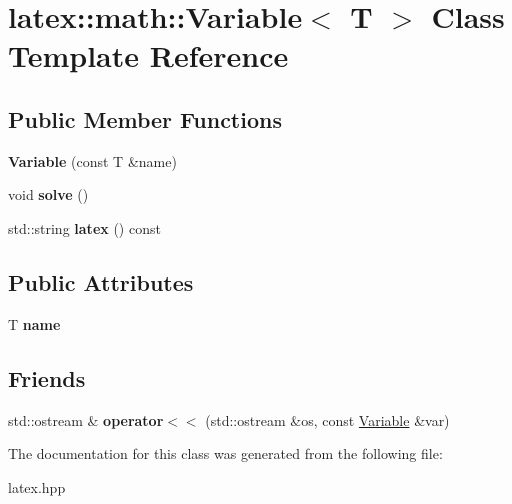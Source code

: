 \hypertarget{classlatex_1_1math_1_1Variable}{\section{latex\-:\-:math\-:\-:Variable$<$ T $>$ Class Template Reference}
\label{classlatex_1_1math_1_1Variable}
}
\subsection*{Public Member Functions}
\begin{DoxyCompactItemize}
\item 
\hypertarget{classlatex_1_1math_1_1Variable_a2844e58e3a136631a4180811d6773f01}{{\bfseries Variable} (const T \&name)}\label{classlatex_1_1math_1_1Variable_a2844e58e3a136631a4180811d6773f01}

\item 
\hypertarget{classlatex_1_1math_1_1Variable_a3b9a17bd28ddfaf85c5634e6a8c7144d}{void {\bfseries solve} ()}\label{classlatex_1_1math_1_1Variable_a3b9a17bd28ddfaf85c5634e6a8c7144d}

\item 
\hypertarget{classlatex_1_1math_1_1Variable_adcd90cb19f6793a54b6571cc30d42e07}{std\-::string {\bfseries latex} () const }\label{classlatex_1_1math_1_1Variable_adcd90cb19f6793a54b6571cc30d42e07}

\end{DoxyCompactItemize}
\subsection*{Public Attributes}
\begin{DoxyCompactItemize}
\item 
\hypertarget{classlatex_1_1math_1_1Variable_a48cda4ab42456ea087dfe149653a1972}{T {\bfseries name}}\label{classlatex_1_1math_1_1Variable_a48cda4ab42456ea087dfe149653a1972}

\end{DoxyCompactItemize}
\subsection*{Friends}
\begin{DoxyCompactItemize}
\item 
\hypertarget{classlatex_1_1math_1_1Variable_a501b51eeedf7e93b817dc202b14a44a7}{std\-::ostream \& {\bfseries operator$<$$<$} (std\-::ostream \&os, const \hyperlink{classlatex_1_1math_1_1Variable}{Variable} \&var)}\label{classlatex_1_1math_1_1Variable_a501b51eeedf7e93b817dc202b14a44a7}

\end{DoxyCompactItemize}


The documentation for this class was generated from the following file\-:\begin{DoxyCompactItemize}
\item 
latex.\-hpp\end{DoxyCompactItemize}
